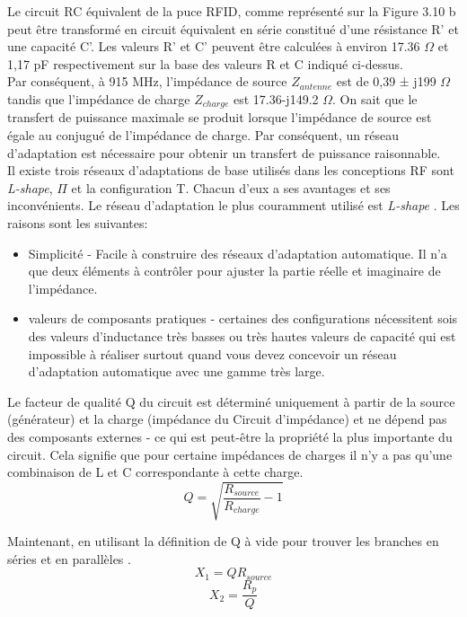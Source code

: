 \documentclass[11pt, a4paper, twoside]{book}
\begin{document}
Le circuit RC équivalent de la puce RFID, comme représenté sur la Figure 3.10 b peut être transformé en circuit équivalent en série constitué d'une résistance  R' et une capacité C'. Les valeurs R' et C'  peuvent être calculées à environ 17.36 \(\Omega\) et 1,17 pF respectivement sur la base des valeurs R et C indiqué ci-dessus.\\


Par conséquent, à 915 MHz, l'impédance de source \(Z_{antenne} \) est de 0,39 ± j199 \(\Omega\) tandis que l'impédance de charge \(Z_{charge} \) est 17.36-j149.2 \(\Omega\). On sait que le transfert de puissance maximale se produit lorsque l'impédance de source est égale au conjugué de l'impédance de charge. Par conséquent, un réseau d'adaptation est nécessaire pour obtenir un transfert de puissance raisonnable.\\

Il existe trois réseaux d'adaptations de base utilisés dans les conceptions RF sont \emph{L-shape}, \(\Pi\) et la configuration T. Chacun d'eux a ses avantages et ses inconvénients. Le réseau d'adaptation le plus couramment utilisé est \emph{L-shape} . Les raisons sont les suivantes:
\begin{itemize}
\item Simplicité - Facile à construire des réseaux d'adaptation automatique. Il n'a que deux éléments à contrôler pour ajuster la partie réelle et imaginaire de l'impédance.
\item valeurs de composants pratiques - certaines des configurations nécessitent sois des valeurs d'inductance très basses ou très hautes valeurs de capacité qui est impossible à réaliser surtout quand vous devez concevoir un réseau d'adaptation automatique avec une gamme très large.\\
\end{itemize}

Le facteur de qualité Q du circuit est déterminé uniquement à partir de la source (générateur) et la charge (impédance du Circuit d'impédance) et ne dépend pas des composants externes - ce qui est peut-être la propriété la plus importante du circuit. Cela signifie que pour certaine impédances de charges il n'y a pas qu'une combinaison de L et C correspondante à cette charge.
\begin{equation}
Q = \sqrt{\dfrac{R_{source}}{R_{charge}}-1}
\end{equation}

Maintenant, en utilisant la définition de Q à vide pour trouver les branches en séries et en parallèles .
\begin{equation}
X_{1}=QR_{source}
\end{equation}
\begin{equation}
X_{2}=\dfrac{R_{p}}{Q}
\end{equation}
\end{document}
